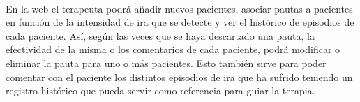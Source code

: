 \paragraph{}
En la web el terapeuta podrá añadir nuevos pacientes, asociar pautas a pacientes en función de la intensidad de ira que se detecte y ver el histórico de episodios de cada paciente. Así, según las veces que se haya descartado una pauta, la efectividad de la misma o los comentarios de cada paciente, podrá modificar o eliminar la pauta para uno o más pacientes. Esto también sirve para poder comentar con el paciente los distintos episodios de ira que ha sufrido teniendo un registro histórico que pueda servir como referencia para guiar la terapia.